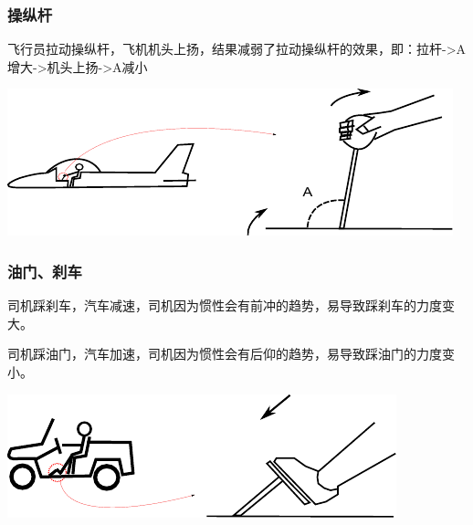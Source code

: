 \documentclass{beamer}
\begin{document}
\begin{frame}
\frametitle{操纵杆}
\label{sec-1-5}


飞行员拉动操纵杆，飞机机头上扬，结果减弱了拉动操纵杆的效果，即：拉杆->A增大->机头上扬->A减小

\includegraphics[width=\textwidth]{image/pilot.pdf}
\end{frame}
\begin{frame}
\frametitle{油门、刹车}
\label{sec-1-6}


司机踩刹车，汽车减速，司机因为惯性会有前冲的趋势，易导致踩刹车的力度变大。

司机踩油门，汽车加速，司机因为惯性会有后仰的趋势，易导致踩油门的力度变小。

\includegraphics[width=\textwidth]{image/drive.pdf}
\end{frame}
\end{document}
